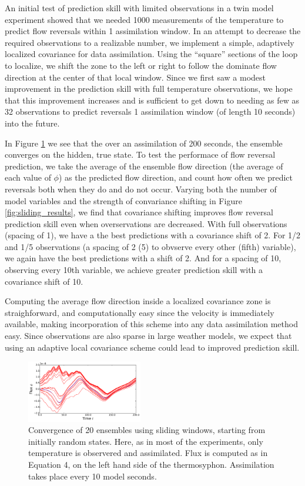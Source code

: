 An initial test of prediction skill with limited observations in a twin model experiment showed that we needed 1000 measurements of the temperature to predict flow reversals within 1 assimilation window.
In an attempt to decrease the required observations to a realizable number, we implement a simple, adaptively localized covariance for data assimilation.
Using the ``square'' sections of the loop to localize, we shift the zone to the left or right to follow the dominate flow direction at the center of that local window.
Since we first saw a modest improvement in the prediction skill with full temperature observations, we hope that this improvement increases and is sufficient to get down to needing as few as 32 observations to predict reversals 1 assimilation window (of length 10 seconds) into the future.

In Figure \ref{fig:sliding_spag} we see that the over an assimilation of 200 seconds, the ensemble converges on the hidden, true state.
To test the performace of flow reversal prediction, we take the average of the ensemble flow direction (the average of each value of $\phi$) as the predicted flow direction, and count how often we predict reversals both when they do and do not occur.
Varying both the number of model variables and the strength of convariance shifting in Figure \ref{fig:sliding_results}, we find that covariance shifting improves flow reversal prediction skill even when overservations are decreased.
With full observations (spacing of 1), we have a the best predictions with a covariance shift of 2.
For 1/2 and 1/5 observations (a spacing of 2 (5) to obvserve every other (fifth) variable), we again have the best predictions with a shift of 2.
And for a spacing of 10, observing every 10th variable, we achieve greater prediction skill with a covariance shift of 10.

Computing the average flow direction inside a localized covariance zone is straighforward, and computationally easy since the velocity is immediately available, making incorporation of this scheme into any data assimilation method easy.
Since observations are also sparse in large weather models, we expect that using an adaptive local covariance scheme could lead to improved prediction skill.

\begin{figure}[t]
  \centering
  \includegraphics[width=0.45\textwidth]{../figures/loop-spaghetti-slide-004-full.pdf}
  \caption[]{
    Convergence of 20 ensembles using sliding windows, starting from initially random states.
    Here, as in most of the experiments, only temperature is observered and assimilated.
    Flux is computed as in Equation 4, on the left hand side of the thermosyphon.
    Assimilation takes place every 10 model seconds.
  }
  \label{fig:sliding_spag}
\end{figure}

